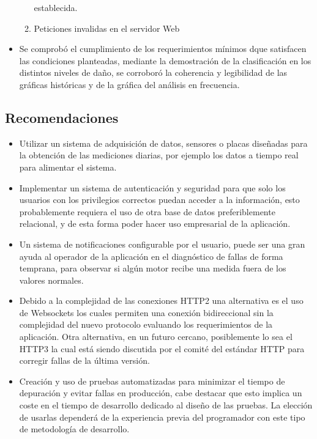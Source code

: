 \begin{itemize}
\begin{enumerate}
                establecida.
            \item Peticiones invalidas en el servidor Web
        \end{enumerate}
    \item Se comprobó el cumplimiento de
        los requerimientos mínimos dque satisfacen las condiciones planteadas,
        mediante la
        demostración de la clasificación en los distintos niveles de daño,
         se corroboró la coherencia y legibilidad
        de las gráficas históricas y de la gráfica del análisis en frecuencia.
\end{itemize}



\subsection{Recomendaciones}
\begin{itemize}
    \item Utilizar un sistema de adquisición de datos, sensores o placas diseñadas
        para la obtención de las mediciones diarias, por ejemplo los datos a tiempo
        real para alimentar el sistema.

    \item  Implementar un sistema de autenticación y seguridad para que solo
        los usuarios con los
        privilegios correctos puedan acceder a la información, esto
        probablemente requiera el uso de otra base de datos preferiblemente
        relacional, y de esta forma poder hacer uso empresarial
        de la aplicación.

    \item Un sistema de notificaciones configurable por el usuario,
        puede ser una gran ayuda al operador de la aplicación en el diagnóstico
        de fallas de forma temprana, para observar si algún motor recibe una
        medida fuera de los valores normales.

    \item Debido a la complejidad de las conexiones HTTP2 una alternativa es el
        uso de Websockets los cuales permiten una conexión bidireccional sin la
        complejidad del nuevo protocolo evaluando  los requerimientos
        de la aplicación. Otra alternativa, en un futuro
        cercano, posiblemente lo sea el HTTP3 la cual está siendo discutida
        por el comité del estándar HTTP para corregir fallas de la última
        versión.

    \item Creación y uso de  pruebas automatizadas para minimizar el tiempo de
        depuración y evitar fallas en producción, cabe destacar que esto
        implica un coste
        en el tiempo de desarrollo dedicado al diseño de las pruebas.
        La elección de usarlas dependerá de la experiencia previa
        del programador con este tipo de metodología de desarrollo.


\end{itemize}
